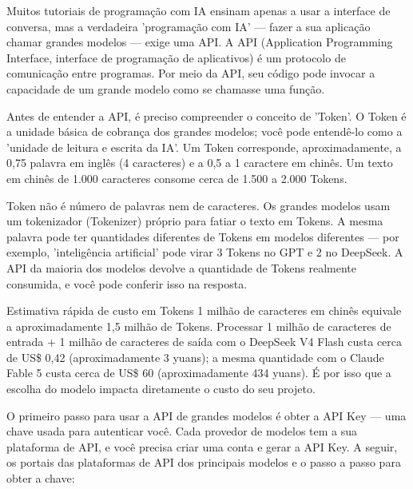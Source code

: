 
Muitos tutoriais de programação com IA ensinam apenas a usar a interface de conversa, mas a verdadeira 'programação com IA' — fazer a sua aplicação chamar grandes modelos — exige uma API. A API (Application Programming Interface, interface de programação de aplicativos) é um protocolo de comunicação entre programas. Por meio da API, seu código pode invocar a capacidade de um grande modelo como se chamasse uma função.


Antes de entender a API, é preciso compreender o conceito de 'Token'. O Token é a unidade básica de cobrança dos grandes modelos; você pode entendê-lo como a 'unidade de leitura e escrita da IA'. Um Token corresponde, aproximadamente, a 0,75 palavra em inglês (4 caracteres) e a 0,5 a 1 caractere em chinês. Um texto em chinês de 1.000 caracteres consome cerca de 1.500 a 2.000 Tokens.

Token não é número de palavras nem de caracteres. Os grandes modelos usam um tokenizador (Tokenizer) próprio para fatiar o texto em Tokens. A mesma palavra pode ter quantidades diferentes de Tokens em modelos diferentes — por exemplo, 'inteligência artificial' pode virar 3 Tokens no GPT e 2 no DeepSeek. A API da maioria dos modelos devolve a quantidade de Tokens realmente consumida, e você pode conferir isso na resposta.

\begin{tcbinfo}{Estimativa rápida de custo em Tokens}
1 milhão de caracteres em chinês equivale a aproximadamente 1,5 milhão de Tokens. Processar 1 milhão de caracteres de entrada + 1 milhão de caracteres de saída com o DeepSeek V4 Flash custa cerca de US\$ 0,42 (aproximadamente 3 yuans); a mesma quantidade com o Claude Fable 5 custa cerca de US\$ 60 (aproximadamente 434 yuans). É por isso que a escolha do modelo impacta diretamente o custo do seu projeto.

\end{tcbinfo}


O primeiro passo para usar a API de grandes modelos é obter a API Key — uma chave usada para autenticar você. Cada provedor de modelos tem a sua plataforma de API, e você precisa criar uma conta e gerar a API Key. A seguir, os portais das plataformas de API dos principais modelos e o passo a passo para obter a chave:


